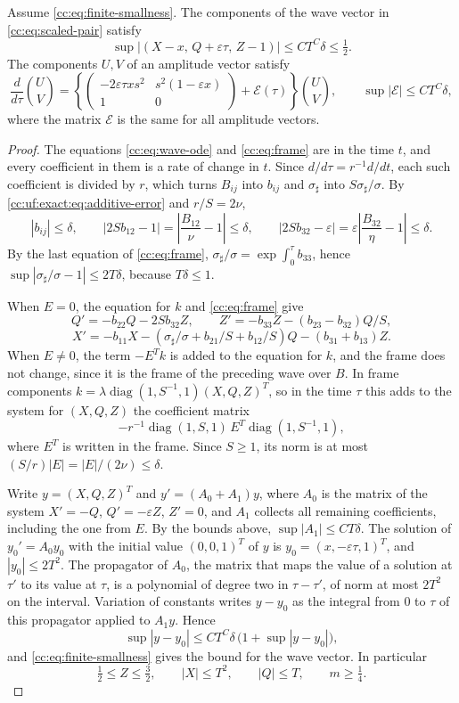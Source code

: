 \begin{lemma}\label{cc:uf:exact:lem:additive}
Assume \eqref{cc:eq:finite-smallness}. The components of the wave
vector in \eqref{cc:eq:scaled-pair} satisfy
\[
 \sup|(X-x,\,Q+\varepsilon\tau,\,Z-1)|\le CT^C\delta\le\tfrac12 .
\]
The components $U,V$ of an amplitude vector satisfy
\[
 \frac{d}{d\tau}\binom UV=\left\{
 \begin{pmatrix}-2\varepsilon\tau xs^2&s^2(1-\varepsilon x)\\1&0\end{pmatrix}
 +\mathcal E(\tau)\right\}\binom UV,
 \qquad \sup|\mathcal E|\le CT^C\delta ,
\]
where the matrix $\mathcal E$ is the same for all amplitude vectors.
\end{lemma}
\begin{proof}
The equations \eqref{cc:eq:wave-ode} and \eqref{cc:eq:frame} are in the
time $t$, and every coefficient in them is a rate of change in $t$.
Since $d/d\tau=r^{-1}d/dt$, each such coefficient is divided by $r$,
which turns $B_{ij}$ into $b_{ij}$ and $\sigma_\sharp$ into
$S\sigma_\sharp/\sigma$. By \eqref{cc:uf:exact:eq:additive-error} and
$r/S=2\nu$,
\[
 |b_{ij}|\le\delta,\qquad
 |2Sb_{12}-1|=\left|\frac{B_{12}}{\nu}-1\right|\le\delta,\qquad
 |2Sb_{32}-\varepsilon|
 =\varepsilon\left|\frac{B_{32}}{\eta}-1\right|\le\delta .
\]
By the last equation of \eqref{cc:eq:frame},
$\sigma_\sharp/\sigma=\exp\int_0^\tau b_{33}$, hence
$\sup|\sigma_\sharp/\sigma-1|\le2T\delta$, because $T\delta\le1$.

When $E=0$, the equation for $k$ and
\eqref{cc:eq:frame} give
\[
 Q'=-b_{22}Q-2Sb_{32}Z,\qquad
 Z'=-b_{33}Z-(b_{23}-b_{32})Q/S,
\]
\[
 X'=-b_{11}X-(\sigma_\sharp/\sigma+b_{21}/S+b_{12}/S)Q
                         -(b_{31}+b_{13})Z.
\]
When $E\ne0$, the term $-E^Tk$ is added to the equation for $k$, and
the frame does not change, since it is the frame of the preceding wave
over $B$. In frame components
$k=\lambda\operatorname{diag}(1,S^{-1},1)(X,Q,Z)^T$, so in the time
$\tau$ this adds to the system for $(X,Q,Z)$ the coefficient matrix
\[
 -r^{-1}\operatorname{diag}(1,S,1)\,E^T\operatorname{diag}(1,S^{-1},1),
\]
where $E^T$ is written in the frame. Since $S\ge1$, its norm is at most
$(S/r)|E|=|E|/(2\nu)\le\delta$.

Write $y=(X,Q,Z)^T$ and $y'=(A_0+A_1)y$, where $A_0$ is the matrix of
the system $X'=-Q$, $Q'=-\varepsilon Z$, $Z'=0$, and $A_1$ collects all
remaining coefficients, including the one from $E$. By the bounds
above, $\sup|A_1|\le CT\delta$. The solution of $y_0'=A_0y_0$ with the
initial value $(0,0,1)^T$ of $y$ is $y_0=(x,-\varepsilon\tau,1)^T$, and
$|y_0|\le2T^2$. The propagator of $A_0$, the matrix that maps the value
of a solution at $\tau'$ to its value at $\tau$, is a polynomial of
degree two in $\tau-\tau'$, of norm at most $2T^2$ on the interval.
Variation of constants writes $y-y_0$ as the integral from $0$ to
$\tau$ of this propagator applied to $A_1y$. Hence
\[
 \sup|y-y_0|\le CT^C\delta\,\bigl(1+\sup|y-y_0|\bigr),
\]
and \eqref{cc:eq:finite-smallness} gives the bound for the wave vector.
In particular
\[
 \tfrac12\le Z\le\tfrac32,\qquad |X|\le T^2,\qquad |Q|\le T,\qquad
 m\ge\tfrac14 .
\]


\end{proof}
